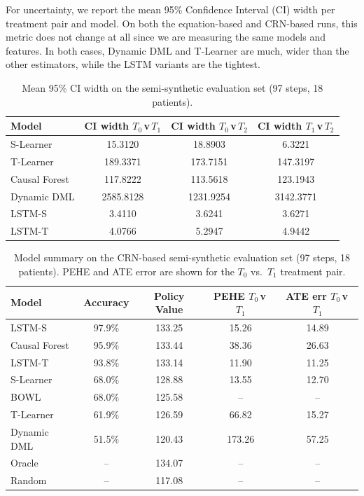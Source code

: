 \documentclass{article}
\begin{document}
For uncertainty, we report the mean 95\% Confidence Interval (CI) width per treatment pair and model.
On both the equation-based and CRN-based runs, this metric does not change at all since we are measuring the same models and features. In both cases, Dynamic DML and T-Learner are much, wider than the other estimators, while the LSTM variants are the tightest.

\begin{table}[H]
    \centering
    \begin{tabular}{lccc}
        \toprule
        \textbf{Model} & \textbf{CI width $T_0$\,v\,$T_1$} & \textbf{CI width $T_0$\,v\,$T_2$} & \textbf{CI width $T_1$\,v\,$T_2$} \\
        \midrule
        S-Learner     & 15.3120 & 18.8903 & 6.3221 \\
        T-Learner     & 189.3371 & 173.7151 & 147.3197 \\
        Causal Forest & 117.8222 & 113.5618 & 123.1943 \\
        Dynamic DML   & 2585.8128 & 1231.9254 & 3142.3771 \\
        LSTM-S        & 3.4110 & 3.6241 & 3.6271 \\
        LSTM-T        & 4.0766 & 5.2947 & 4.9442 \\
        \bottomrule
    \end{tabular}
    \caption{Mean 95\% CI width on the semi-synthetic evaluation set (97 steps, 18 patients).}
    \label{tab:semi_ci_width}
\end{table}

\begin{table}[H]
    \centering
    \begin{tabular}{lcccc}
        \toprule
        \textbf{Model} & \textbf{Accuracy} & \textbf{Policy Value} & \textbf{PEHE $T_0$\,v\,$T_1$} & \textbf{ATE err $T_0$\,v\,$T_1$} \\
        \midrule
        LSTM-S        & 97.9\% & 133.25 & 15.26  & 14.89 \\
        Causal Forest & 95.9\% & 133.44 & 38.36  & 26.63 \\
        LSTM-T        & 93.8\% & 133.14 & 11.90  & 11.25 \\
        S-Learner     & 68.0\% & 128.88 & 13.55  & 12.70 \\
        BOWL          & 68.0\% & 125.58 & --     & --    \\
        T-Learner     & 61.9\% & 126.59 & 66.82  & 15.27 \\
        Dynamic DML   & 51.5\% & 120.43 & 173.26 & 57.25 \\
        \midrule
        Oracle        & --      & 134.07 & --     & --    \\
        Random        & --      & 117.08 & --     & --    \\
        \bottomrule
    \end{tabular}
    \caption{Model summary on the CRN-based semi-synthetic evaluation set (97 steps, 18 patients). PEHE and ATE error are shown for the $T_0$ vs.\ $T_1$ treatment pair.}
    \label{tab:crn_model_summary}
\end{table}
\end{document}
